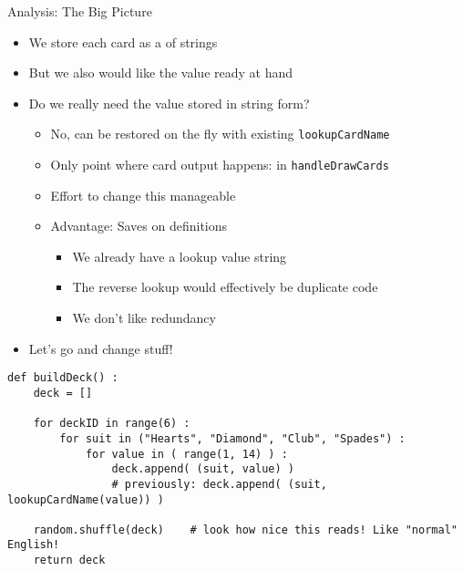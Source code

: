\begin{frame}[fragile]{Analysis: The Big Picture}
%
\begin{itemize}
\item We store each card as a  of strings
\item But we also would like the value ready at hand
\item Do we really need the value stored in string form?
	\begin{itemize}
	\item No, can be restored on the fly with existing \texttt{lookupCardName}
	\item Only point where card output happens: in \texttt{handleDrawCards}
	\item[\Thus] Effort to change this manageable
	\item Advantage: Saves on definitions
		\begin{itemize}
		\item We already have a lookup value \thus string
		\item The reverse lookup would effectively be duplicate code
		\item We don't like redundancy
		\end{itemize}
	\end{itemize}
\item Let's go and change stuff!
\end{itemize}
%
\end{frame}


\begin{frame}[fragile]
%
\begin{codebox}
\begin{verbatim}
def buildDeck() :
    deck = []
    
    for deckID in range(6) :
        for suit in ("Hearts", "Diamond", "Club", "Spades") :
            for value in ( range(1, 14) ) :
                deck.append( (suit, value) )
                # previously: deck.append( (suit, lookupCardName(value)) )
    
    random.shuffle(deck)    # look how nice this reads! Like "normal" English!
    return deck
\end{verbatim}
\end{codebox}
%
\end{frame}


